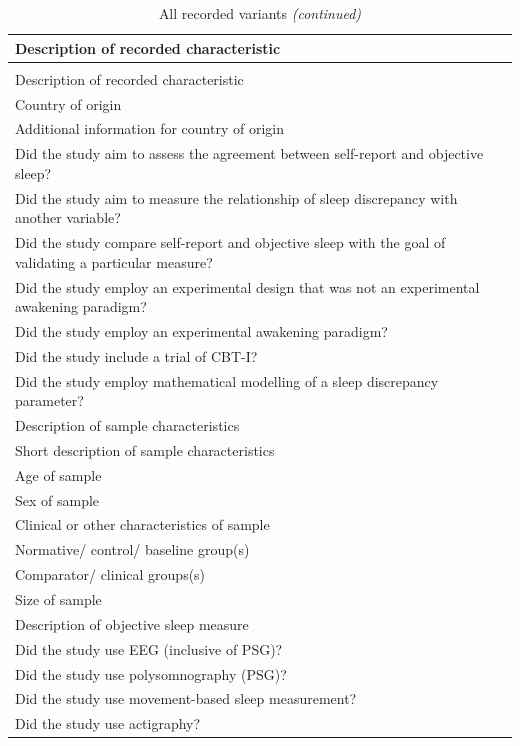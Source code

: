 \documentclass[
]{article}
\begin{document}
\begin{longtable}[t]{l}
\caption{\label{tab:allvariants}All recorded variants}\\
\toprule
Description of recorded characteristic\\
\midrule
\endfirsthead
\caption[]{\label{tab:allvariants}All recorded variants \textit{(continued)}}\\
\toprule
Description of recorded characteristic\\
\midrule
\endhead

\endfoot
\bottomrule
\endlastfoot
Country of origin\\
Additional information for country of origin\\
Did the study aim to assess the agreement between self-report and objective sleep?\\
Did the study aim to measure the relationship of sleep discrepancy with another variable?\\
Did the study compare self-report and objective sleep with the goal of validating a particular measure?\\
\addlinespace
Did the study employ an experimental design that was not an experimental awakening paradigm?\\
Did the study employ an experimental awakening paradigm?\\
Did the study include a trial of CBT-I?\\
Did the study employ mathematical modelling of a sleep discrepancy parameter?\\
Description of sample characteristics\\
\addlinespace
Short description of sample characteristics\\
Age of sample\\
Sex of sample\\
Clinical or other characteristics of sample\\
Normative/ control/ baseline group(s)\\
\addlinespace
Comparator/ clinical groups(s)\\
Size of sample\\
Description of objective sleep measure\\
Did the study use EEG (inclusive of PSG)?\\
Did the study use polysomnography (PSG)?\\
\addlinespace
Did the study use movement-based sleep measurement?\\
Did the study use actigraphy?\\

\end{longtable}
\end{document}
